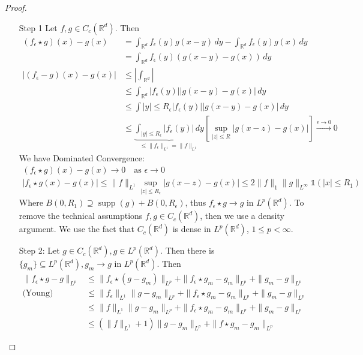 \documentclass{report}
\theoremstyle{tommy}
\newcommand{\supp}{\operatorname{supp}}
\begin{document}
  \begin{proof}
    \begin{itemize}
      \item [Step 1] Let \(f, g \in C_c(\mathbb{R}^d)\). Then
      \begin{align*}
        (f_\epsilon \star g)(x) - g(x) 
        &= \int_{\mathbb{R}^d} f_\epsilon(y) g(x-y) \, dy - \int_{\mathbb{R}^d} f_\epsilon(y) g(x) \, dy \\
        &= \int_{\mathbb{R}^d} f_\epsilon(y) (g(x-y) - g(x)) \, dy \\
        |(f_\epsilon - g)(x) - g(x)|
        &\le \left| \int_{\mathbb{R}^d} \right| \\
        &\le \int_{\mathbb{R}^d} |f_\epsilon(y)| |g(x-y) - g(x)| \, dy \\
        &\le \int{|y| \le R_\epsilon} |f_\epsilon(y)||g(x-y) - g(x)| \, dy \\
        &\le \underbrace{\int_{|y| \le R_\epsilon} |f_\epsilon(y)| \, dy}_{\le \|f_\epsilon\|_{L^1} = \|f\|_{L^1}} \left[\sup_{|z| \le R} |g(x-z) - g(x)| \right] \xrightarrow{\epsilon \to 0} 0
      \end{align*}
      We have Dominated Convergence:
      \begin{align*}
        (f_\epsilon \star g)(x) - g(x) \to 0 \quad \text{as } \epsilon \to 0 \\
        |f_\epsilon \star g(x) - g(x)| \le \|f\|_{L^1} \sup_{|z| \le R_\epsilon} |g(x-z) - g(x)| \le 2 \|f\|_1 \|g\|_{L^\infty} \mathbb{1}(|x| \le R_1)
      \end{align*}
      Where \(B(0, R_1) \supseteq \supp(g) + B(0, R_\epsilon)\), thus
      \(f_\epsilon \star g \to g\) in \(L^p(\mathbb{R}^d)\). To remove the technical assumptions \(f, g \in C_c(\mathbb{R}^d)\), then we use a density argument. We use the fact that \(C_c(\mathbb{R}^d)\) is dense in \(L^p(\mathbb{R}^d)\), \(1 \le p < \infty\).
      \item[Step 2:] Let \(g \in C_c(\mathbb{R}^d), g \in L^p(\mathbb{R}^d)\). Then there is \(\{g_m\} \subseteq L^p(\mathbb{R}^d), g_m \to g\) in \(L^p(\mathbb{R}^d)\). Then 
      \begin{align*}
        \|f_\epsilon \star g - g\|_{L^p} 
        &\le \|f_\epsilon \star (g - g_m)\|_{L^p}  + \|f_\epsilon \star g_m - g_m \|_{L^p}+ \|g_m - g\|_{L^p} \\
        \text{(Young)} \quad &\le \|f_\epsilon\|_{L^1}\|g-g_m\|_{L^p}  + \|f_\epsilon \star g_m - g_m \|_{L^p}+ \|g_m - g\|_{L^p} \\
        &\le \|f\|_{L^1}\|g-g_m\|_{L^p}  + \|f_\epsilon \star g_m - g_m \|_{L^p}+ \|g_m - g\|_{L^p} \\
        &\le (\|f\|_{L^1} + 1) \|g - g_m\|_{L^p} + \|f \star g_m - g_m\|_{L^p}
      \end{align*}
      

\end{itemize}
\end{proof}
\end{document}
